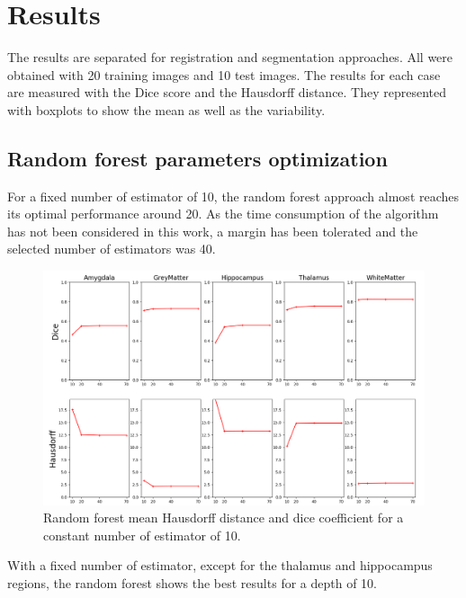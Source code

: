\section*{Results}
The results are separated for registration and segmentation approaches. All were obtained with 20 training images and 10 test images. The results for each case are measured with the Dice score and the Hausdorff distance. They represented with boxplots to show the mean as well as the variability.

\subsection*{Random forest parameters optimization}
For a fixed number of estimator of 10, the random forest approach almost reaches its optimal performance around 20. As the time consumption of the algorithm has not been considered in this work, a margin has been tolerated and the selected number of estimators was 40. 

\begin{figure}[h!]
	\centering
	\includegraphics[width=\linewidth]{img/plotMLOptDepth2}
	\caption{Random forest mean Hausdorff distance and dice coefficient for a constant number of estimator of 10.}
	\label{fig:MLOptDepth}
\end{figure}

With a fixed number of estimator, except for the thalamus and hippocampus regions, the random forest shows the best results for a depth of 10. 

